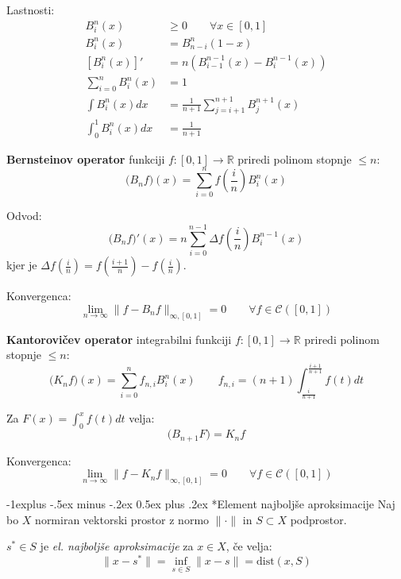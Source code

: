 \documentclass[a3paper,8pt]{extarticle}
\makeatletter
\renewcommand{\subsection}{\@startsection{subsection}{2}{0mm}%
                                {-1explus -.5ex minus -.2ex}%
                                {0.5ex plus .2ex}%
                                {\normalfont\normalsize\bfseries}}
\makeatother
\begin{document}
\begin{multicols}{5}
Lastnosti:
\begin{align*}
	B_i^n(x) &\geq 0 \qquad \forall x \in [0, 1] \\
	B_i^n(x) &= B_{n-i}^n(1-x) \\
	\left[B_i^n(x)\right]' &= n \left( B_{i-1}^{n-1}(x) - B_i^{n-1}(x)\right) \\
	\sum_{i=0}^n B_i^n(x) &= 1 \\
	\int B_i^n(x) dx &= \frac{1}{n+1} \sum_{j=i+1}^{n+1} B_j^{n+1}(x) \\
	\int_0^1 B_i^n(x) dx &= \frac{1}{n+1}
\end{align*}

\textbf{Bernsteinov operator} funkciji $f: [0, 1] \to \mathbb{R}$ priredi polinom stopnje $\leq n$:
\[ \big(B_n f\big)(x) = \sum_{i=0}^{n} f\left(\frac{i}{n}\right)  B_i^n(x)\]

Odvod:
\[ \big(B_n f\big)'(x) = n\sum_{i=0}^{n-1} \Delta f\left(\frac{i}{n}\right)  B_i^{n-1}(x) \]
kjer je $ \Delta f\left(\frac{i}{n}\right) = f\left(\frac{i+1}{n}\right) - f\left(\frac{i}{n}\right)$.

Konvergenca:
\[\lim_{n \to \infty} \| f - B_n f \|_{\infty, [0,1]} = 0 \qquad \forall f \in \mathcal{C}([0,1]) \]

\textbf{Kantorovičev operator} integrabilni funkciji $f: [0, 1] \to \mathbb{R}$ priredi polinom stopnje $\leq n$:
\[ \big(K_n f\big)(x) = \sum_{i=0}^{n} f_{n,i} B_i^n(x) \qquad f_{n,i} = (n+1) \int_{\frac{i}{n+1}}^{\frac{i+1}{n+1}} f(t) dt \]

Za $F(x) = \int_0^x f(t) dt$ velja:
\[\big(B_{n+1} F \big) = K_n f \]

Konvergenca:
\[ \lim_{n \to \infty} \| f - K_n f \|_{\infty, [0, 1]} = 0 \qquad \forall f \in \mathcal{C}([0,1])\]


\subsection*{Element najboljše aproksimacije}
Naj bo $X$ normiran vektorski prostor z normo $\| \cdot \|$ in $S \subset X$ podprostor.

$s^* \in S$ je \textit{el. najboljše aproksimacije} za $x \in X$, če velja:
\[ \| x - s^* \| = \inf_{s \in S} \| x - s \| = \text{dist}(x, S) \]



\end{multicols}
\end{document}
